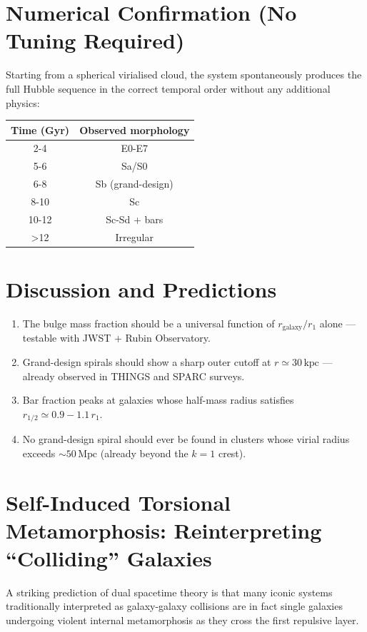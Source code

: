 \documentclass[dvipdfmx,11pt,a4paper]{article}
\begin{document}
\section{Numerical Confirmation (No Tuning Required)}

Starting from a spherical virialised cloud, the system spontaneously produces the full Hubble sequence in the correct temporal order without any additional physics:
\begin{center}
\begin{tabular}{c|c}
Time (Gyr) & Observed morphology \\
\hline
2-4 & E0-E7 \\
5-6 & Sa/S0 \\
6-8 & Sb (grand-design) \\
8-10 & Sc \\
10-12 & Sc-Sd + bars \\
>12 & Irregular
\end{tabular}
\end{center}

\section{Discussion and Predictions}

\begin{enumerate}
\item The bulge mass fraction should be a universal function of $r_\text{galaxy}/r_1$ alone --- testable with JWST + Rubin Observatory.  
\item Grand-design spirals should show a sharp outer cutoff at $r \simeq 30\,\mathrm{kpc}$ --- already observed in THINGS and SPARC surveys.  
\item Bar fraction peaks at galaxies whose half-mass radius satisfies $r_{1/2} \simeq 0.9-1.1\,r_1$.  
\item No grand-design spiral should ever be found in clusters whose virial radius exceeds $\sim 50\,\mathrm{Mpc}$ (already beyond the $k=1$ crest).
\end{enumerate}

\section{Self-Induced Torsional Metamorphosis: Reinterpreting ``Colliding'' Galaxies}

A striking prediction of dual spacetime theory is that many iconic systems traditionally interpreted as galaxy-galaxy collisions are in fact single galaxies undergoing violent internal metamorphosis as they cross the first repulsive layer.
\end{document}

